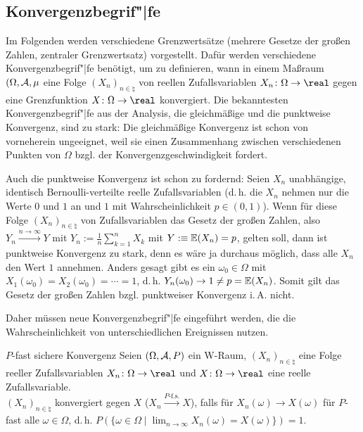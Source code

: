 \pagebreak

\subsection{%
    Konvergenzbegrif"|fe%
}

\begin{Bem}
    Im Folgenden werden verschiedene Grenzwertsätze
    (mehrere Gesetze der großen Zahlen, zentraler Grenzwertsatz) vorgestellt.
    Dafür werden verschiedene Konvergenzbegrif"|fe benötigt,
    um zu definieren, wann in einem Maßraum $(\Omega, \mathcal{A}, \mu$ eine Folge
    $(X_n)_{n \in \natural}$ von reellen Zufallsvariablen $X_n\colon \Omega \rightarrow \real$
    gegen eine Grenzfunktion $X\colon \Omega \rightarrow \real$ konvergiert.
    Die bekanntesten Konvergenzbegrif"|fe aus der
    Analysis, die gleichmäßige und die punktweise Konvergenz, sind zu stark:
    Die gleichmäßige Konvergenz ist schon von vorneherein ungeeignet, weil sie einen Zusammenhang
    zwischen verschiedenen Punkten von $\Omega$ bzgl. der Konvergenzgeschwindigkeit fordert.

    Auch die punktweise Konvergenz ist schon zu fordernd:
    Seien $X_n$ unabhängige, identisch Ber\-noulli-verteilte reelle Zufallsvariablen
    (d.\,h. die $X_n$ nehmen nur die Werte $0$ und $1$ an und $1$ mit Wahrscheinlichkeit
    $p \in (0, 1)$).
    Wenn für diese Folge $(X_n)_{n \in \natural}$ von Zufallsvariablen das Gesetz der großen
    Zahlen, also $Y_n \xrightarrow{n \to \infty} Y$ mit $Y_n := \frac{1}{n} \sum_{k=1}^n X_k$ mit
    $Y :\equiv \mathbb{E}(X_n) = p$, gelten soll, dann ist punktweise Konvergenz zu stark,
    denn es wäre ja durchaus möglich, dass alle $X_n$ den Wert $1$ annehmen.
    Anders gesagt gibt es ein $\omega_0 \in \Omega$ mit
    $X_1(\omega_0) = X_2(\omega_0) = \dotsb = 1$, d.\,h. $Y_n(\omega_0) \to 1 \not= p = \mathbb{E}(X_n)$.
    Somit gilt das Gesetz der großen Zahlen bzgl. punktweiser Konvergenz i.\,A. nicht.

    Daher müssen neue Konvergenzbegrif"|fe eingeführt werden, die die
    Wahrscheinlichkeit von unterschiedlichen Ereignissen nutzen.
\end{Bem}

\linie

\begin{Def}{$P$-fast sichere Konvergenz}
    Seien $(\Omega, \mathcal{A}, P)$ ein W-Raum,
    $(X_n)_{n \in \natural}$ eine Folge reeller Zufallsvariablen
    $X_n\colon \Omega \rightarrow \real$ und
    $X\colon \Omega \rightarrow \real$ eine reelle Zufallsvariable.\\
    $(X_n)_{n \in \natural}$ konvergiert  gegen $X$
    ($X_n \xrightarrow{P\text{-f.s.}} X$), falls
    für $X_n(\omega) \to X(\omega)$ für $P$-fast alle $\omega \in \Omega$,
    d.\,h. $P(\{\omega \in \Omega \;|\; \lim_{n \to \infty} X_n(\omega) = X(\omega)\}) = 1$.
\end{Def}

